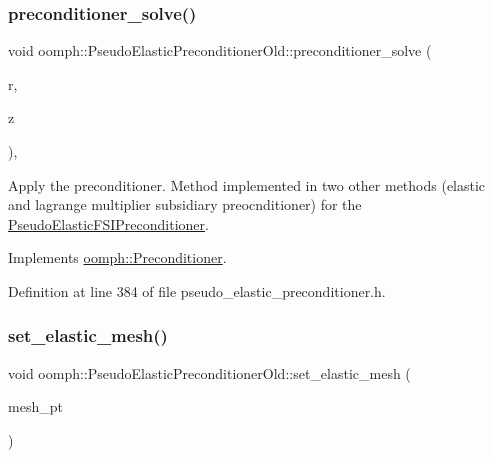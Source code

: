 \subsubsection{\texorpdfstring{preconditioner\+\_\+solve()}{preconditioner\_solve()}}
{\footnotesize\ttfamily void oomph\+::\+Pseudo\+Elastic\+Preconditioner\+Old\+::preconditioner\+\_\+solve (\begin{DoxyParamCaption}\item[{const \hyperlink{classoomph_1_1DoubleVector}{Double\+Vector} \&}]{r,  }\item[{\hyperlink{classoomph_1_1DoubleVector}{Double\+Vector} \&}]{z }\end{DoxyParamCaption})\hspace{0.3cm}{\ttfamily [inline]}, {\ttfamily [virtual]}}



Apply the preconditioner. Method implemented in two other methods (elastic and lagrange multiplier subsidiary preocnditioner) for the \hyperlink{classoomph_1_1PseudoElasticFSIPreconditioner}{Pseudo\+Elastic\+F\+S\+I\+Preconditioner}. 



Implements \hyperlink{classoomph_1_1Preconditioner_ace1199369e4465cd2b9a34884bb64ec8}{oomph\+::\+Preconditioner}.



Definition at line 384 of file pseudo\+\_\+elastic\+\_\+preconditioner.\+h.

\mbox{\label{classoomph_1_1PseudoElasticPreconditionerOld_a96464001afad81606a6d298f4045de70}} 
\subsubsection{\texorpdfstring{set\+\_\+elastic\+\_\+mesh()}{set\_elastic\_mesh()}}
{\footnotesize\ttfamily void oomph\+::\+Pseudo\+Elastic\+Preconditioner\+Old\+::set\+\_\+elastic\+\_\+mesh (\begin{DoxyParamCaption}\item[{\hyperlink{classoomph_1_1Mesh}{Mesh} $\ast$}]{mesh\+\_\+pt }\end{DoxyParamCaption})\hspace{0.3cm}{\ttfamily [inline]}}



